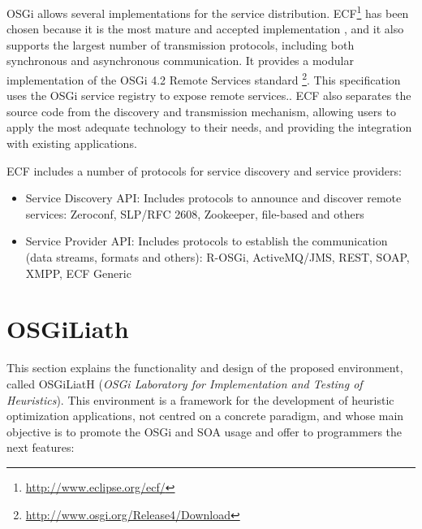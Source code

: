 \documentclass{sig-alternate}
\begin{document}
OSGi allows several implementations for the service distribution. ECF\footnote{\url{http://www.eclipse.org/ecf/}} has been chosen because it is the most mature and accepted implementation \cite{petzold2011dynamic}, and it also supports the largest number of transmission protocols, including both synchronous and asynchronous communication. It provides a modular implementation of the OSGi 4.2 Remote Services standard \footnote{\url{http://www.osgi.org/Release4/Download}}. This specification uses the OSGi service registry to expose remote services.. ECF also separates the source code from the discovery and transmission mechanism, allowing users to apply the most adequate technology to their needs, and providing the integration with existing applications. %

ECF includes a number of protocols for service discovery and service providers:
\begin{itemize}
\item Service Discovery API: Includes protocols to announce and discover remote services: Zeroconf, SLP/RFC 2608, Zookeeper, file-based and others
\item Service Provider API: Includes protocols to establish the communication (data streams, formats and others): R-OSGi, ActiveMQ/JMS, REST, SOAP, XMPP, ECF Generic
\end{itemize}

\section{OSGiLiath}
This section explains the functionality and design of the proposed environment, called OSGiLiatH ({\em OSGi Laboratory for Implementation and Testing of Heuristics}). This environment is a  framework for the development of heuristic optimization applications, not centred on a concrete paradigm, and whose main objective is to promote the OSGi and SOA usage and offer to programmers the next features:
\end{document}

